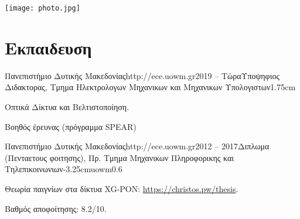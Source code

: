 \documentclass{mycv}
\begin{document}
	\thispagestyle{plain}
	\begin{minipage}{.7\textwidth}
		\begin{flushleft}
		\end{flushleft}
	\end{minipage}
	\begin{minipage}{.3\textwidth}
		\begin{flushright}
			\texttt{[image: photo.jpg]}
		\end{flushright}
	\end{minipage}
	\vspace*{-0.75cm}
	\section{Εκπαιδευση}

	\begin{EntryDated}{Πανεπιστήμιο Δυτικής Μακεδονίας}{http://ece.uowm.gr}{2019 -- Τώρα}{Υποψηφιος Διδακτορας, Τμημα Ηλεκτρολογων Μηχανικων και Μηχανικων Υπολογιστων}{1.75cm}
	\begin{Itemize}
		\item Οπτικά Δίκτυα και Βελτιστοποίηση.
		\item Βοηθός έρευνας (πρόγραμμα SPEAR)
	\end{Itemize}
	\end{EntryDated}
	
	\vspace*{0.5cm}
	
	\begin{EntryDatedLogo}{Πανεπιστήμιο Δυτικής Μακεδονίας}{http://ece.uowm.gr}{2012 -- 2017}{Διπλωμα (Πενταετους φοιτησης), Πρ. Τμημα Μηχανικων Πληροφορικης και Τηλεπικοινωνιων}{-3.25cm}{uowm}{0.6}
		\begin{Itemize}
			\item Θεωρία παιγνίων στα δίκτυα XG-PON: \url{https://christos.pw/thesis}.
			\item Βαθμός αποφοίτησης: 8.2/10.
		\end{Itemize}
	\end{EntryDatedLogo}
	
\end{document}
